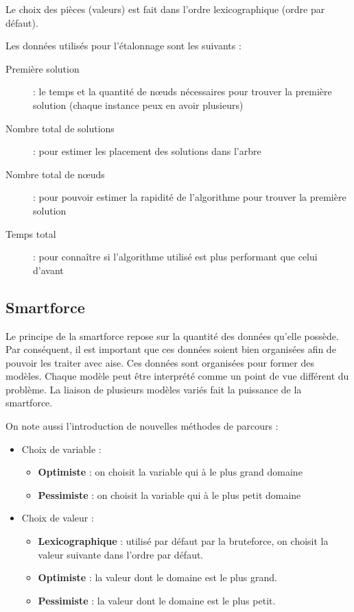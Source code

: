 	Le choix des pièces (valeurs) est fait dans l'ordre lexicographique (ordre par défaut).
	
	Les données utilisés pour l'étalonnage sont les suivants :
	
	\begin{description}
		\item[Première solution] : le temps et la quantité de n\oe uds nécessaires pour trouver la première solution (chaque instance peux en avoir plusieurs)
		\item[Nombre total de solutions] : pour estimer les placement des solutions dans l'arbre
		\item[Nombre total de n\oe uds] : pour pouvoir estimer la rapidité de l'algorithme pour trouver la première solution
		\item[Temps total] : pour connaître si l'algorithme utilisé est plus performant que celui d'avant
	\end{description}
\newpage

	\subsection{Smartforce}

	Le principe de la smartforce repose sur la quantité des données qu'elle possède. Par conséquent, il est important que ces données soient bien organisées afin de pouvoir les traiter avec aise. Ces données sont organisées pour former des modèles. Chaque modèle peut être interprété comme un point de vue différent du problème. La liaison de plusieurs modèles variés fait la puissance de la smartforce.
	
	On note aussi l'introduction de nouvelles méthodes de parcours :
	
	\begin{itemize}
		\item Choix de variable :
		\begin{itemize}
			\item\textbf{Optimiste} : on choisit la variable qui à le plus grand domaine
			\item\textbf{Pessimiste} : on choisit la variable qui à le plus petit domaine
		\end{itemize}
		\item Choix de valeur :
		\begin{itemize}
			\item \textbf{Lexicographique} : utilisé par défaut par la bruteforce, on choisit la valeur suivante dans l'ordre par défaut.
			\item \textbf{Optimiste} : la valeur dont le domaine est le plus grand.
			\item \textbf{Pessimiste} : la valeur dont le domaine est le plus petit.
		\end{itemize}
	\end{itemize}
	
